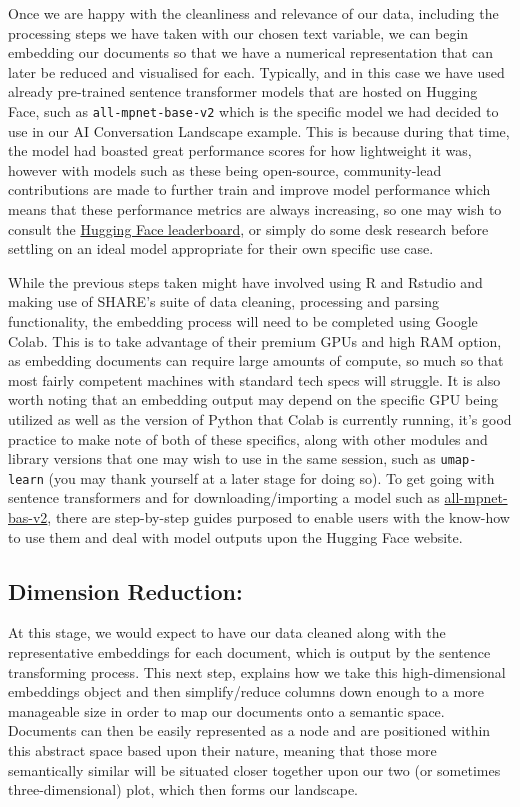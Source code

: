 \documentclass[
  letterpaper,
  DIV=11,
  numbers=noendperiod]{scrreprt}
\begin{document}
Once we are happy with the cleanliness and relevance of our data,
including the processing steps we have taken with our chosen text
variable, we can begin embedding our documents so that we have a
numerical representation that can later be reduced and visualised for
each. Typically, and in this case we have used already pre-trained
sentence transformer models that are hosted on Hugging Face, such as
\texttt{all-mpnet-base-v2} which is the specific model we had decided to
use in our AI Conversation Landscape example. This is because during
that time, the model had boasted great performance scores for how
lightweight it was, however with models such as these being open-source,
community-lead contributions are made to further train and improve model
performance which means that these performance metrics are always
increasing, so one may wish to consult the
\href{https://huggingface.co/spaces/mteb/leaderboard}{Hugging Face
leaderboard}, or simply do some desk research before settling on an
ideal model appropriate for their own specific use case.

While the previous steps taken might have involved using R and Rstudio
and making use of SHARE's suite of data cleaning, processing and parsing
functionality, the embedding process will need to be completed using
Google Colab. This is to take advantage of their premium GPUs and high
RAM option, as embedding documents can require large amounts of compute,
so much so that most fairly competent machines with standard tech specs
will struggle. It is also worth noting that an embedding output may
depend on the specific GPU being utilized as well as the version of
Python that Colab is currently running, it's good practice to make note
of both of these specifics, along with other modules and library
versions that one may wish to use in the same session, such as
\texttt{umap-learn} (you may thank yourself at a later stage for doing
so). To get going with sentence transformers and for
downloading/importing a model such as
\href{https://huggingface.co/sentence-transformers/all-mpnet-base-v2}{all-mpnet-bas-v2},
there are step-by-step guides purposed to enable users with the know-how
to use them and deal with model outputs upon the Hugging Face website.

\subsection{Dimension Reduction:}\label{dimension-reduction}

At this stage, we would expect to have our data cleaned along with the
representative embeddings for each document, which is output by the
sentence transforming process. This next step, explains how we take this
high-dimensional embeddings object and then simplify/reduce columns down
enough to a more manageable size in order to map our documents onto a
semantic space. Documents can then be easily represented as a node and
are positioned within this abstract space based upon their nature,
meaning that those more semantically similar will be situated closer
together upon our two (or sometimes three-dimensional) plot, which then
forms our landscape.
\end{document}
